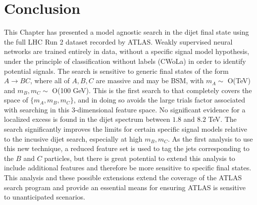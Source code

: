 \section{Conclusion}
\label{sec:CWoLa:conclusion}
This Chapter has presented a model agnostic search in the dijet final state using the full LHC Run 2 dataset recorded by ATLAS.
Weakly supervised neural networks are trained entirely in data, without a specific signal model hypothesis, under the principle of classification without labels (CWoLa) in order to identify potential signals.
The search is sensitive to generic final states of the form $A\rightarrow BC$, where all of $A,B,C$ are massive and may be BSM, with $m_A\sim$ O(TeV) and $m_B,m_C\sim$ O(100 GeV).
This is the first search to that completely covers the space of $\{m_A,m_B,m_C\}$, and in doing so avoids the large trials factor associated with searching in this 3-dimensional feature space.
No significant evidence for a localized excess is found in the dijet spectrum between $1.8$ and $8.2$ TeV.
The search significantly improves the limits for certain specific signal models relative to the incusive dijet search, especially at high $m_B,m_C$.
As the first analysis to use this new technique, a reduced feature set is used to tag the jets corresponding to the $B$ and $C$ particles, but there is great potential to extend this analysis to include additional features and therefore be more sensitive to specific final states.
This analysis and these possible extensions extend the coverage of the ATLAS search program and provide an essential means for ensuring ATLAS is sensitive to unanticipated scenarios.
